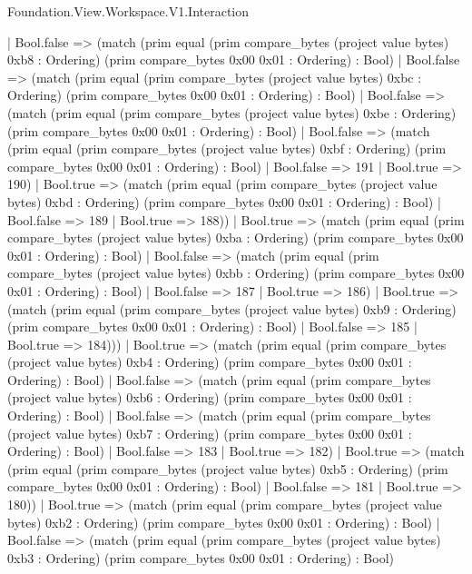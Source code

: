 \begin{lexlean}{Foundation.View.Workspace.V1.Interaction}
\begin{semanticmodule}
{            | Bool.false => (match (prim equal (prim compare_bytes (project value bytes) 0xb8 : Ordering) (prim compare_bytes 0x00 0x01 : Ordering) : Bool)
              | Bool.false => (match (prim equal (prim compare_bytes (project value bytes) 0xbc : Ordering) (prim compare_bytes 0x00 0x01 : Ordering) : Bool)
                | Bool.false => (match (prim equal (prim compare_bytes (project value bytes) 0xbe : Ordering) (prim compare_bytes 0x00 0x01 : Ordering) : Bool)
                  | Bool.false => (match (prim equal (prim compare_bytes (project value bytes) 0xbf : Ordering) (prim compare_bytes 0x00 0x01 : Ordering) : Bool)
                    | Bool.false => 191
                    | Bool.true => 190)
                  | Bool.true => (match (prim equal (prim compare_bytes (project value bytes) 0xbd : Ordering) (prim compare_bytes 0x00 0x01 : Ordering) : Bool)
                    | Bool.false => 189
                    | Bool.true => 188))
                | Bool.true => (match (prim equal (prim compare_bytes (project value bytes) 0xba : Ordering) (prim compare_bytes 0x00 0x01 : Ordering) : Bool)
                  | Bool.false => (match (prim equal (prim compare_bytes (project value bytes) 0xbb : Ordering) (prim compare_bytes 0x00 0x01 : Ordering) : Bool)
                    | Bool.false => 187
                    | Bool.true => 186)
                  | Bool.true => (match (prim equal (prim compare_bytes (project value bytes) 0xb9 : Ordering) (prim compare_bytes 0x00 0x01 : Ordering) : Bool)
                    | Bool.false => 185
                    | Bool.true => 184)))
              | Bool.true => (match (prim equal (prim compare_bytes (project value bytes) 0xb4 : Ordering) (prim compare_bytes 0x00 0x01 : Ordering) : Bool)
                | Bool.false => (match (prim equal (prim compare_bytes (project value bytes) 0xb6 : Ordering) (prim compare_bytes 0x00 0x01 : Ordering) : Bool)
                  | Bool.false => (match (prim equal (prim compare_bytes (project value bytes) 0xb7 : Ordering) (prim compare_bytes 0x00 0x01 : Ordering) : Bool)
                    | Bool.false => 183
                    | Bool.true => 182)
                  | Bool.true => (match (prim equal (prim compare_bytes (project value bytes) 0xb5 : Ordering) (prim compare_bytes 0x00 0x01 : Ordering) : Bool)
                    | Bool.false => 181
                    | Bool.true => 180))
                | Bool.true => (match (prim equal (prim compare_bytes (project value bytes) 0xb2 : Ordering) (prim compare_bytes 0x00 0x01 : Ordering) : Bool)
                  | Bool.false => (match (prim equal (prim compare_bytes (project value bytes) 0xb3 : Ordering) (prim compare_bytes 0x00 0x01 : Ordering) : Bool)
}
\end{semanticmodule}
\end{lexlean}
